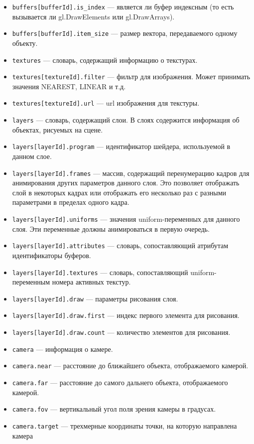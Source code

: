 \begin{itemize}
\item \texttt{buffers[bufferId].is\_index} --- является ли буфер индексным (то есть вызывается ли gl.DrawElements или gl.DrawArrays).
\item \texttt{buffers[bufferId].item\_size} --- размер вектора, передаваемого одному объекту.
\item \texttt{textures} --- словарь, содержащий информацию о текстурах.
\item \texttt{textures[textureId].filter} --- фильтр для изображения. Может принимать значения NEAREST, LINEAR и т.д.
\item \texttt{textures[textureId].url} --- url изображения для текстуры.
\item \texttt{layers} --- словарь, содержащий слои. В слоях содержится информация об объектах, рисуемых на сцене.
\item \texttt{layers[layerId].program} --- идентификатор шейдера, используемой в данном слое.
\item \texttt{layers[layerId].frames} --- массив, содержащий перенумерацию кадров для анимирования других параметров данного слоя. Это позволяет отображать слой в некоторых кадрах или отображать его несколько раз с разными параметрами в пределах одного кадра. 
\item \texttt{layers[layerId].uniforms} --- значения uniform-переменных для данного слоя. Эти переменные должны анимироваться в первую очередь. 
\item \texttt{layers[layerId].attributes} --- словарь, сопоставляющий атрибутам идентификаторы буферов.
\item \texttt{layers[layerId].textures} --- словарь, сопоставляющий uniform-переменным номера активных текстур.
\item \texttt{layers[layerId].draw} --- параметры рисования слоя.
\item \texttt{layers[layerId].draw.first} --- индекс первого элемента для рисования.
\item \texttt{layers[layerId].draw.count} --- количество элементов для рисования.
\item \texttt{camera} --- информация о камере.
\item \texttt{camera.near} --- расстояние до ближайшего объекта, отображаемого камерой.
\item \texttt{camera.far} --- расстояние до самого дальнего объекта, отображаемого камерой.
\item \texttt{camera.fov} --- вертикальный угол поля зрения камеры в градусах.
\item \texttt{camera.target} --- трехмерные координаты точки, на которую направлена камера

\end{itemize}

